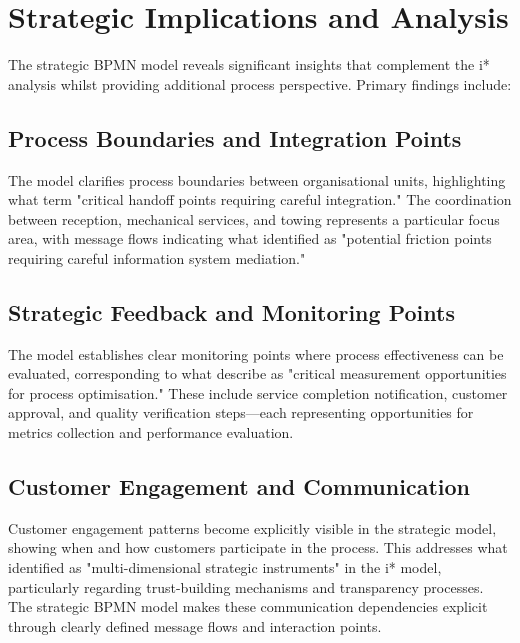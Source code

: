 \documentclass[14pt,a4paper]{article}
\begin{document}
\section{Strategic Implications and Analysis}

The strategic BPMN model reveals significant insights that complement the i* analysis whilst providing additional process perspective. Primary findings include:

\subsection{Process Boundaries and Integration Points}

The model clarifies process boundaries between organisational units, highlighting what \textit{\parencite[p. 219]{Kluza2017}} term "critical handoff points requiring careful integration." The coordination between reception, mechanical services, and towing represents a particular focus area, with message flows indicating what \textit{\parencite[p. 48]{Gorton2017}} identified as "potential friction points requiring careful information system mediation."

\subsection{Strategic Feedback and Monitoring Points}

The model establishes clear monitoring points where process effectiveness can be evaluated, corresponding to what \textit{\parencite[p. 195]{Delgado2020}} describe as "critical measurement opportunities for process optimisation." These include service completion notification, customer approval, and quality verification steps—each representing opportunities for metrics collection and performance evaluation.

\subsection{Customer Engagement and Communication}

Customer engagement patterns become explicitly visible in the strategic model, showing when and how customers participate in the process. This addresses what \textit{\parencite[p. 177]{Estrada2020}} identified as "multi-dimensional strategic instruments" in the i* model, particularly regarding trust-building mechanisms and transparency processes. The strategic BPMN model makes these communication dependencies explicit through clearly defined message flows and interaction points.
\end{document}
